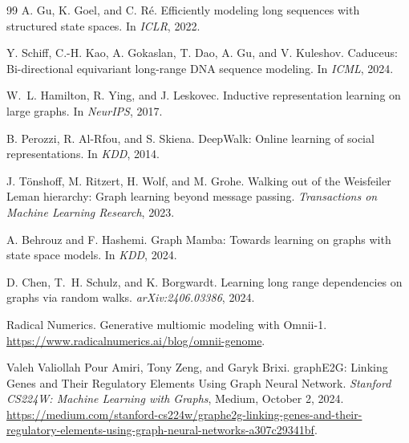{\begin{thebibliography}{99}
A. Gu, K. Goel, and C. R\'e.
Efficiently modeling long sequences with structured state spaces.
In \emph{ICLR}, 2022.

Y. Schiff, C.-H. Kao, A. Gokaslan, T. Dao, A. Gu, and V. Kuleshov.
Caduceus: Bi-directional equivariant long-range DNA sequence modeling.
In \emph{ICML}, 2024.

W.~L. Hamilton, R. Ying, and J. Leskovec.
Inductive representation learning on large graphs.
In \emph{NeurIPS}, 2017.


B. Perozzi, R. Al-Rfou, and S. Skiena.
DeepWalk: Online learning of social representations.
In \emph{KDD}, 2014.

J. T\"onshoff, M. Ritzert, H. Wolf, and M. Grohe.
Walking out of the Weisfeiler Leman hierarchy: Graph learning beyond message passing.
\emph{Transactions on Machine Learning Research}, 2023.

A. Behrouz and F. Hashemi.
Graph Mamba: Towards learning on graphs with state space models.
In \emph{KDD}, 2024.

D. Chen, T.~H. Schulz, and K. Borgwardt.
Learning long range dependencies on graphs via random walks.
\emph{arXiv:2406.03386}, 2024.


Radical Numerics.
Generative multiomic modeling with Omnii-1.
\url{https://www.radicalnumerics.ai/blog/omnii-genome}.

Valeh Valiollah Pour Amiri, Tony Zeng, and Garyk Brixi.
graphE2G: Linking Genes and Their Regulatory Elements Using Graph Neural Network.
\emph{Stanford CS224W: Machine Learning with Graphs}, Medium, October 2, 2024.
\url{https://medium.com/stanford-cs224w/graphe2g-linking-genes-and-their-regulatory-elements-using-graph-neural-networks-a307c29341bf}.

\end{thebibliography}
}

